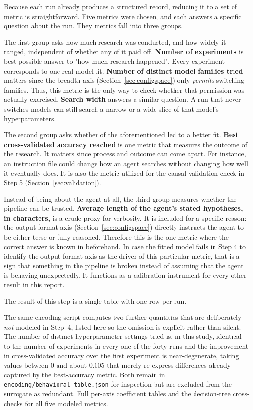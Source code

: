 \documentclass[11pt]{article}
\begin{document}
Because each run already produces a structured record, reducing it to a set of metric is straightforward. Five metrics were chosen, and each answers a specific question about the run. They metrics fall into three groups.

The first group asks how much research was conducted, and how widely it ranged, independent of whether any of it paid off. \textbf{Number of experiments} is best possible answer to "how much research happened". Every experiment corresponds to one real model fit. \textbf{Number of distinct model families tried} matters since the breadth axis (Section~\ref{sec:configspace}) only \emph{permits} switching families. Thus, this metric is the only way to check whether that permission was actually exercised. \textbf{Search width} answers a similar question. A run that never switches models can still search a narrow or a wide slice of that model's hyperparameters.

The second group asks whether of the aforementioned led to a better fit. \textbf{Best cross-validated accuracy reached} is  one metric that measures the outcome of the research. It matters since process and outcome can come apart. For instance, an instruction file could change how an agent searches without changing how well it eventually does. It is also the metric utilized for the causal-validation check in Step 5 (Section~\ref{sec:validation}).

Instead of being about the agent at all, the third group measures whether the pipeline can be trusted. \textbf{Average length of the agent's stated hypotheses, in characters,} is a  crude proxy for verbosity. It is included for a specific reason: the output-format axis (Section~\ref{sec:configspace}) directly  instructs the agent to be either terse or fully reasoned. Therefore this is the one metric where the correct answer is known in beforehand. In case the fitted model fails in Step 4 to identify the output-format axis as the driver of this particular metric, that is a sign that something in the pipeline is broken instead of assuming that the agent is behaving unexpectedly. It functions as a calibration instrument for every other result in this report.

The result of this step is a single table with one row per run.

The same encoding script computes two further quantities that are deliberately \emph{not} modeled in Step~4, listed here so the omission is explicit rather than silent. The number of distinct hyperparameter settings tried is, in this study, identical to the number of experiments in every one of the forty runs and the improvement in cross-validated accuracy over the first experiment is near-degenerate, taking values between 0 and about 0.005 that merely re-express differences already captured by the best-accuracy metric. Both remain in \texttt{encoding/behavioral\_table.json} for inspection but are excluded from the surrogate as redundant. Full per-axis coefficient tables and the decision-tree cross-checks for all five modeled metrics.
\end{document}
